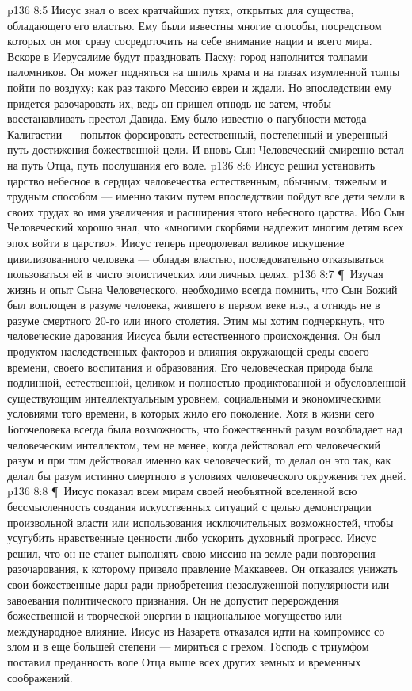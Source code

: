 \vs p136 8:5 Иисус знал о всех кратчайших путях, открытых для существа, обладающего его властью. Ему были известны многие способы, посредством которых он мог сразу сосредоточить на себе внимание нации и всего мира. Вскоре в Иерусалиме будут праздновать Пасху; город наполнится толпами паломников. Он может подняться на шпиль храма и на глазах изумленной толпы пойти по воздуху; как раз такого Мессию евреи и ждали. Но впоследствии ему придется разочаровать их, ведь он пришел отнюдь не затем, чтобы восстанавливать престол Давида. Ему было известно о пагубности метода Калигастии --- попыток форсировать естественный, постепенный и уверенный путь достижения божественной цели. И вновь Сын Человеческий смиренно встал на путь Отца, путь послушания его воле.
\vs p136 8:6 Иисус решил установить царство небесное в сердцах человечества естественным, обычным, тяжелым и трудным способом --- именно таким путем впоследствии пойдут все дети земли в своих трудах во имя увеличения и расширения этого небесного царства. Ибо Сын Человеческий хорошо знал, что «многими скорбями надлежит многим детям всех эпох войти в царство». Иисус теперь преодолевал великое искушение цивилизованного человека --- обладая властью, последовательно отказываться пользоваться ей в чисто эгоистических или личных целях.
\vs p136 8:7 \P\ Изучая жизнь и опыт Сына Человеческого, необходимо всегда помнить, что Сын Божий был воплощен в разуме человека, жившего в первом веке н.э., а отнюдь не в разуме смертного 20\hyp{}го или иного столетия. Этим мы хотим подчеркнуть, что человеческие дарования Иисуса были естественного происхождения. Он был продуктом наследственных факторов и влияния окружающей среды своего времени, своего воспитания и образования. Его человеческая природа была подлинной, естественной, целиком и полностью продиктованной и обусловленной существующим интеллектуальным уровнем, социальными и экономическими условиями того времени, в которых жило его поколение. Хотя в жизни сего Богочеловека всегда была возможность, что божественный разум возобладает над человеческим интеллектом, тем не менее, когда действовал его человеческий разум и при том действовал именно как человеческий, то делал он это так, как делал бы разум истинно смертного в условиях человеческого окружения тех дней.
\vs p136 8:8 \P\ Иисус показал всем мирам своей необъятной вселенной всю бессмысленность создания искусственных ситуаций с целью демонстрации произвольной власти или использования исключительных возможностей, чтобы усугубить нравственные ценности либо ускорить духовный прогресс. Иисус решил, что он не станет выполнять свою миссию на земле ради повторения разочарования, к которому привело правление Маккавеев. Он отказался унижать свои божественные дары ради приобретения незаслуженной популярности или завоевания политического признания. Он не допустит перерождения божественной и творческой энергии в национальное могущество или международное влияние. Иисус из Назарета отказался идти на компромисс со злом и в еще большей степени --- мириться с грехом. Господь с триумфом поставил преданность воле Отца выше всех других земных и временных соображений.
